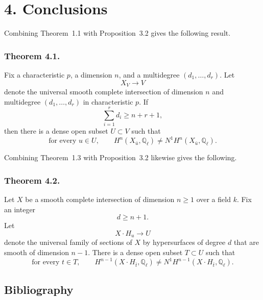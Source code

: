 \section*{4. Conclusions}

Combining Theorem~1.1 with Proposition~3.2 gives the following result.

\subsubsection*{Theorem 4.1.}
Fix a characteristic $p$, a dimension $n$, and a multidegree
$(d_1,\ldots,d_r)$.  Let
\begin{equation}\tag{4.1.0}
X_V\longrightarrow V
\end{equation}
denote the universal smooth complete intersection of dimension $n$ and
multidegree $(d_1,\ldots,d_r)$ in characteristic $p$.  If
\begin{equation}\tag{4.1.1}
\sum_{i=1}^{r}d_i\geq n+r+1,
\end{equation}
then there is a dense open subset $U\subset V$ such that
\begin{equation}\tag{4.1.2}
\text{for every }u\in U,\qquad
H^n(X_{\bar u},\mathbb Q_\ell)\ne N^1H^n(X_{\bar u},\mathbb Q_\ell).
\end{equation}

Combining Theorem~1.3 with Proposition~3.2 likewise gives the following.

\subsubsection*{Theorem 4.2.}
Let $X$ be a smooth complete intersection of dimension $n\geq1$ over a
field $k$.  Fix an integer
\begin{equation}\tag{4.2.1}
d\geq n+1.
\end{equation}
Let
\begin{equation}\tag{4.2.2}
X\!\cdot\!H_u\longrightarrow U
\end{equation}
denote the universal family of sections of $X$ by hypersurfaces of degree
$d$ that are smooth of dimension $n-1$.  There is a dense open subset
$T\subset U$ such that
\begin{equation}\tag{4.2.3}
\text{for every }t\in T,\qquad
H^{n-1}(X\!\cdot\!H_{\bar t},\mathbb Q_\ell)
\ne N^1H^{n-1}(X\!\cdot\!H_{\bar t},\mathbb Q_\ell).
\end{equation}

\subsection*{Bibliography}

